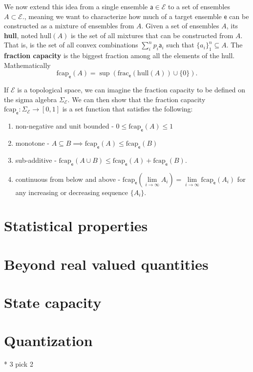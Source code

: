 \documentclass[10pt,twocolumn, nofootinbib]{revtex4-2}
\newcommand\hull{\mathrm{hull}}
\newcommand\fraction{\mathrm{frac}}
\newcommand\frcap{\mathrm{fcap}}
\newcommand{\ens}[1][e] {\mathsf{#1}} %
\newcommand{\Ens}[1][E] {\mathcal{#1}} %
\begin{document}
We now extend this idea from a single ensemble $\ens[a] \in \Ens$ to a set of ensembles $A \subset \Ens$., meaning we want to characterize how much of a target ensemble $\ens$ can be constructed as a mixture of ensembles from $A$. Given a set of ensembles $A$, its \textbf{hull}, noted $\hull(A)$ is the set of all mixtures that can be constructed from $A$. That is, is the set of all convex combinations $\sum_i^n p_i \ens[a]_i$ such that $\{a_i\}_1^n \subseteq A$. The \textbf{fraction capacity} is the biggest fraction among all the elements of the hull. Mathematically
\begin{equation}
	\frcap_{\ens}(A) = \sup(\fraction_{\ens}(\hull(A))\cup\{0\}).
\end{equation}

If $\Ens$ is a topological space, we can imagine the fraction capacity to be defined on the sigma algebra $\Sigma_{\Ens}$. We can then show that the fraction capacity $\frcap_{\ens} : \Sigma_{\Ens} \to [0,1]$ is a set function that satisfies the following:
\begin{enumerate}
	\item non-negative and unit bounded - $0 \leq \frcap_{\ens}(A) \leq 1$
	\item monotone - $A \subseteq B \implies \frcap_{\ens}(A) \leq \frcap_{\ens}(B)$
	\item sub-additive - $\frcap_{\ens}(A \cup B) \leq \frcap_{\ens}(A) + \frcap_{\ens}(B)$.
	\item continuous from below and above - $\frcap_{\ens}(\lim\limits_{i \to \infty} A_i) = \lim\limits_{i \to \infty} \frcap_{\ens}(A_i)$ for any increasing or decreasing sequence $\{A_i\}$.
\end{enumerate}



\section{Statistical properties}

\section{Beyond real valued quantities}


\section{State capacity}

\section{Quantization}
* 3 pick 2
\end{document}
